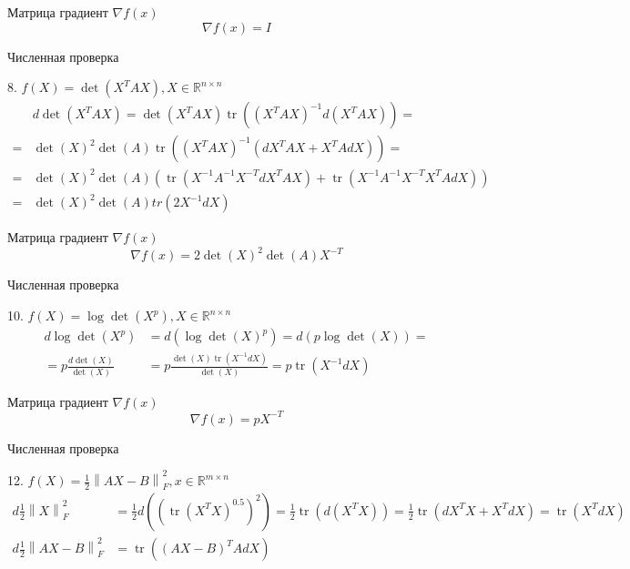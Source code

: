 \documentclass{article}
\DeclareMathOperator{\tr}{tr}
\newcommand{\RM}[2] {\mathbb{R}^{#1 \times #2}}
\newcommand{\norm}[1]{\left\lVert#1\right\rVert}
\begin{document}
    Матрица градиент $\nabla f(x)$
    \begin{equation*}
         \nabla f(x) = I
    \end{equation*}
    
    Численная проверка
    
    \bigbreak
    
    8. $f(X) = \det(X^TAX), X \in  \RM{n}{n}$
    \begin{align*}
        &d\det(X^TAX) = \det(X^TAX)\tr((X^TAX)^{-1}d(X^TAX)) =\\
        = &\det(X)^2\det(A)\tr((X^TAX)^{-1}(dX^TAX + X^TAdX)) =\\ 
        = &\det(X)^2\det(A)(\tr(X^{-1}A^{-1}X^{-T}dX^TAX) + \tr(X^{-1}A^{-1}X^{-T}X^TAdX))\\
        = &\det(X)^2\det(A)tr(2X^{-1}dX)
    \end{align*}
    
    Матрица градиент $\nabla f(x)$
    \begin{equation*}
         \nabla f(x) = 2\det(X)^2\det(A)X^{-T}
    \end{equation*}
    
    Численная проверка
    
    \bigbreak
    
    10. $f(X) = \log\det(X^p), X \in  \RM{n}{n}$
    \begin{align*}
        d\log\det(X^p) &= d(\log\det(X)^p) = d(p\log\det(X)) =\\
        = p\frac{d\det(X)}{\det(X)} &= p\frac{\det(X)\tr(X^{-1}dX)}{\det(X)} = p\tr(X^{-1}dX)
    \end{align*}
    
    Матрица градиент $\nabla f(x)$
    \begin{equation*}
         \nabla f(x) = pX^{-T}
    \end{equation*}
    
    Численная проверка
    
    \bigbreak
    
    12. $f(X) = \frac{1}{2}\norm{AX - B}^2_F, x \in \RM{m}{n}$
    \begin{align*}
        d\frac{1}{2}\norm{X}^2_F &= \frac{1}{2}d((\tr(X^TX)^{0.5})^2) = \frac{1}{2}\tr(d(X^TX)) =
        \frac{1}{2}\tr(dX^TX + X^TdX) = \tr(X^TdX)\\
        d\frac{1}{2}\norm{AX - B}^2_F &= \tr((AX - B)^TAdX)
    \end{align*}
    
\end{document}

